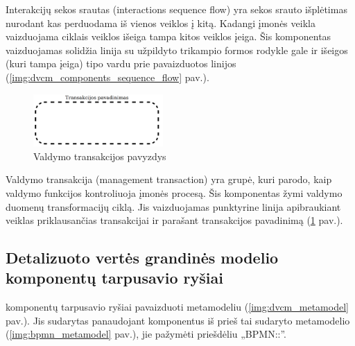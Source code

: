 Interakcijų sekos srautas (interactions sequence flow) yra sekos srauto išplėtimas nurodant kas perduodama iš vienos veiklos į kitą. Kadangi įmonės veikla vaizduojama ciklais veiklos išeiga tampa kitos veiklos įeiga. Šis komponentas vaizduojamas solidžia linija su užpildyto trikampio formos rodykle gale ir išeigos (kuri tampa įeiga) tipo vardu prie pavaizduotos linijos (\ref{img:dvcm_components_sequence_flow} pav.). 

\begin{figure}[H]
	\centering
	\includegraphics[height=2cm]{img/dvcm_components/management_transaction}
	\caption{Valdymo transakcijos pavyzdys}
	\label{img:dvcm_components_management_transaction}
\end{figure}

Valdymo transakcija (management transaction) yra grupė, kuri parodo, kaip valdymo funkcijos kontroliuoja įmonės procesą. Šis komponentas žymi valdymo duomenų transformacijų ciklą. Jis vaizduojamas punktyrine linija apibraukiant veiklas priklausančias transakcijai ir parašant transakcijos pavadinimą (\ref{img:dvcm_components_management_transaction} pav.). 

\subsection{Detalizuoto vertės grandinės modelio komponentų tarpusavio ryšiai}

\DVCM komponentų tarpusavio ryšiai pavaizduoti metamodeliu (\ref{img:dvcm_metamodel} pav.). Jis sudarytas panaudojant komponentus iš prieš tai sudaryto \BPMN metamodelio (\ref{img:bpmn_metamodel} pav.), jie pažymėti priešdėliu „BPMN::”.

